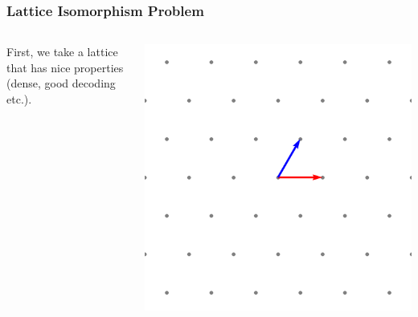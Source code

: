\documentclass[
aspectratio=169, %
t, %
onlytextwidth, %
10pt, %
]{beamer}
\begin{document}
\begin{frame}
    \frametitle{Lattice Isomorphism Problem}
    \begin{columns}[T]
        \begin{column}{0.48\linewidth}
            First, we take a lattice that has nice properties (dense, good decoding etc.).

        \end{column}
        \begin{column}{0.48\linewidth}
            \includegraphics[width=\linewidth]{a2_good_basis.png}
        \end{column}
    \end{columns}
\end{frame}

\end{document}
